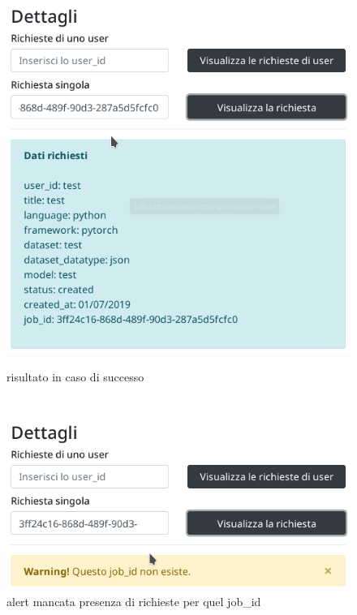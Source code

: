 \documentclass[a4paper,12pt, oneside]{book}
\begin{document}
\begin{figure}[H]
\centering
\begin{minipage}{.5\textwidth}
  \centering
  \includegraphics[scale = 0.42]{img/good-job.png}
  \caption{risultato in caso di successo}
\end{minipage}%
\begin{minipage}{.5\textwidth}
  \centering
  \includegraphics[scale = 0.4]{img/no-job.png}
  \caption{alert mancata presenza di richieste per quel job\_id}
\end{minipage}
\end{figure}
\end{document}
